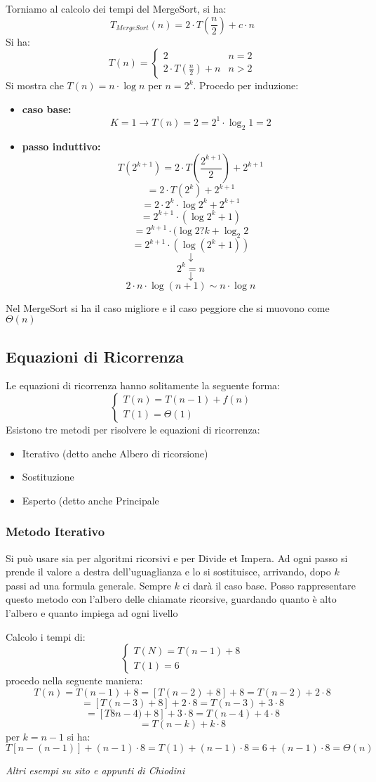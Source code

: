 \documentclass[a4paper,12pt,oneside,tikz]{book}
\begin{document}
Torniamo al calcolo dei tempi del MergeSort, si ha:
$$T_{MergeSort}(n)=2\cdot T\left(\frac{n}{2}\right)+c\cdot n$$
Si ha:
$$T(n)=\begin{cases}
2 & n=2\\
2\cdot T\left(\frac{n}{2}\right)+n & n>2
\end{cases}$$
\newpage
Si mostra che $T(n)=n\cdot \log n$ per $n=2^k$. Procedo per induzione:
\begin{itemize}
\item \textbf{caso base:}  $$K=1\longrightarrow T(n)=2=2^1\cdot \log_2 1=2$$
\item  \textbf{passo induttivo:} $$T(2^{k+1})=2\cdot T\left(\frac{2^{k+1}}{2}\right)+2^{k+1}$$ $$=2\cdot T(2^k)+2^{k+1}$$ $$=2\cdot 2^k\cdot \log 2^k +2^{k+1}$$ $$=2^{k+1}\cdot (\log 2^k+1)$$ $$=2^{k+1}\cdot (\log 2?k+\log_2 2 $$ $$=2^{k+1}\cdot (\log (2^k+1))$$ $$\downarrow$$ $$2^k=n$$ $$\downarrow$$ $$2\cdot n\cdot \log (n+1)\sim n\cdot \log n$$
\end{itemize}
Nel MergeSort si ha il caso migliore e il caso peggiore che si muovono come $\Theta(n)$
\subsection{Equazioni di Ricorrenza}
Le equazioni di ricorrenza hanno solitamente la seguente forma:
$$\begin{cases}
T(n)=T(n-1)+f(n)\\
T(1)=\Theta(1)
\end{cases}$$
Esistono tre metodi per risolvere le equazioni di ricorrenza:
\begin{itemize}
\item Iterativo (detto anche Albero di ricorsione)
\item Sostituzione
\item Esperto (detto anche Principale
\end{itemize}
\subsubsection{Metodo Iterativo}
Si può usare sia per algoritmi ricorsivi e per Divide et Impera. Ad ogni passo si prende il valore a destra dell'uguaglianza e lo si sostituisce, arrivando, dopo $k$ passi ad una formula generale. Sempre $k$ ci darà il caso base. Posso rappresentare questo metodo con l'albero delle chiamate ricorsive, guardando quanto è alto l'albero e quanto impiega ad ogni livello
\begin{esempio}
Calcolo i tempi di:
$$\begin{cases}
T(N)=T(n-1)+8\\
T(1)=6
\end{cases}$$
procedo nella seguente maniera:
$$T(n)=T(n-1)+8=[T(n-2)+8]+8=T(n-2)+2\cdot 8$$
$$=[T(n-3)+8]+2\cdot 8= T(n-3)+3\cdot 8$$
$$=[T8n-4)+8]+3\cdot 8=T(n-4)+4\cdot 8$$
$$=T(n-k)+k\cdot 8$$
per $k=n-1$ si ha:
$$T[n-(n-1)]+(n-1)\cdot 8=T(1)+(n-1)\cdot 8=6+(n-1)\cdot 8=\Theta(n)$$
\end{esempio}
\textit{Altri esempi su sito e appunti di Chiodini}
\end{document}
